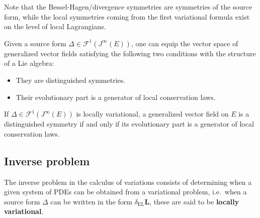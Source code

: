     \begin{remark}
        Note that the Bessel-Hagen/divergence symmetries are symmetries of the source form, while the local symmetries coming from the first variational formula exist on the level of local Lagrangians.
    \end{remark}

    \begin{property}
        Given a source form $\Delta\in\mathcal{F}^1(J^\infty(E))$, one can equip the vector space of generalized vector fields satisfying the following two conditions with the structure of a Lie algebra:
        \begin{itemize}
            \item They are distinguished symmetries.
            \item Their evolutionary part is a generator of local conservation laws.
        \end{itemize}
    \end{property}
    \begin{theorem}[Noether]
        If $\Delta\in\mathcal{F}^1(J^\infty(E))$ is locally variational, a generalized vector field on $E$ is a distinguished symmetry if and only if its evolutionary part is a generator of local conservation laws.
    \end{theorem}

\subsection{Inverse problem}\label{section:inverse_problem}

    The inverse problem in the calculus of variations consists of determining when a given system of PDEs can be obtained from a variational problem, i.e.~when a source form $\Delta$ can be written in the form $\delta_{\text{EL}}\mathbf{L}$, these are said to be \textbf{locally variational}.


